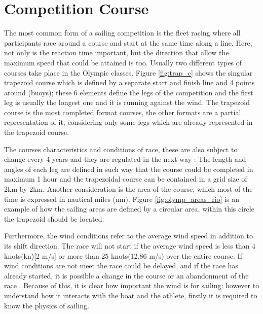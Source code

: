 \section{Competition Course}\label{tracks}
The most common form of a sailing competition is the fleet racing where all participants race around a course and start at the same time along a line. Here, not only is the reaction time important, but the direction that allow the maximum speed that could be attained is too. Usually two different types of courses take place in the Olympic classes. Figure \ref{fig:trap_c} shows the singular trapezoid course which is defined by a separate start and finish line and 4 points around (buoys); these 6 elements define the legs of the competition and the first leg is usually the longest one and it is running against the wind.
The trapezoid course is the most completed format courses, the other formats are a partial representation of it, considering only some legs which are already represented in the trapezoid course.\par 

The courses characteristics and conditions of race, these are also subject to change every 4 years and they are regulated in the next way \cite{race_pol}: The length and angles of each leg are defined in such way that the course could be completed in maximum 1 hour and the trapezoidal course can be contained in a grid size of 2km by 2km.  Another consideration is the area of the course,  which most of the time is expressed in nautical miles (nm). Figure \ref{fig:olymp_areas_rio} is an example of how the sailing areas are defined by a circular area, within this circle the trapezoid should be located. \par 
Furthermore, the wind conditions refer to the average wind speed in addition to its shift direction. The race will not start if the average wind speed is less than 4 knots(kn)[2 m/s] or more than 25 knots(12.86 m/s) over the entire course. %
If wind conditions are not meet the race could be delayed, and if the race has already started, it is possible a change in the course or an abandonment of the race \cite{race_pol}. Because of this, it is clear how important the wind is for sailing; however to understand how it interacts with the boat and the athlete, firstly it is required to know the physics of sailing. \par 

